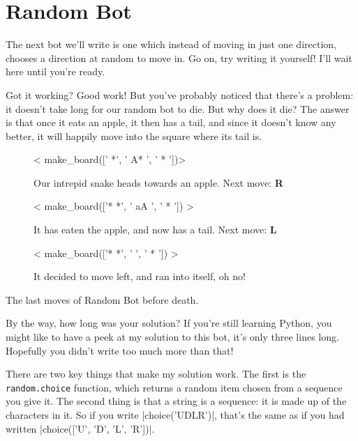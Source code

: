 
\section{Random Bot}

The next bot we’ll write is one which instead of moving in just one direction,
chooses a direction at random to move in.
Go on, try writing it yourself! I’ll wait here until you’re ready.

Got it working? Good work!
But you’ve probably noticed that there’s a problem:
it doesn’t take long for our random bot to die.
But why does it die?
The answer is that once it eats an apple, it then has a tail, and since it
doesn’t know any better, it will happily move into the square where its tail is.

\begin{board}
\hfill
%
\begin{subfigure}{.3\linewidth}
< make_board(['   *', ' A* ', ' *  '])>
\caption{Our intrepid snake heads towards an apple. Next move: \textbf{R}}
\label{brd:random-death:1}
\end{subfigure}
\hfill
%
\begin{subfigure}{.3\linewidth}
< make_board(['*  *', ' aA ', ' *  ']) >
\caption{It has eaten the apple, and now has a tail. Next move: \textbf{L}}
\label{brd:random-death:2}
\end{subfigure}
\hfill
%
\begin{subfigure}{.3\linewidth}
< make_board(['*  *', '    ', ' *  ']) >
\caption{It decided to move left, and ran into itself, oh no!}
\label{brd:random-death:3}
\end{subfigure}
%
\hfill

\caption{The last moves of Random Bot before death.}
\label{brd:random-death}
\end{board}

\pagebreak

By the way, how long was your solution?
If you’re still learning Python, you might like to have a peek at my solution to
this bot, it’s only three lines long.
Hopefully you didn’t write too much more than that!


There are two key things that make my solution work.
The first is the \texttt{random.choice} function,
which returns a random item chosen from a sequence you give it.
The second thing is that a string is a sequence:
it is made up of the characters in it.
So if you write |choice('UDLR')|,
that’s the same as if you had written
|choice(['U', 'D', 'L', 'R'])|.

